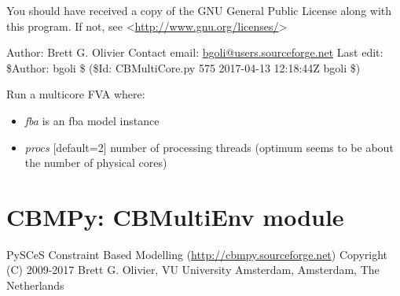 \documentclass[a4paper,11pt,english]{sphinxmanual}
\begin{document}
You should have received a copy of the GNU General Public License
along with this program.  If not, see \textless{}\url{http://www.gnu.org/licenses/}\textgreater{}

Author: Brett G. Olivier
Contact email: \href{mailto:bgoli@users.sourceforge.net}{bgoli@users.sourceforge.net}
Last edit: \$Author: bgoli \$ (\$Id: CBMultiCore.py 575 2017-04-13 12:18:44Z bgoli \$)

\begin{fulllineitems}
\label{modules_doc:cbmpy.CBMultiCore.grouper}
\end{fulllineitems}


\begin{fulllineitems}
\label{modules_doc:cbmpy.CBMultiCore.runMultiCoreFVA}
Run a multicore FVA where:
\begin{itemize}
\item {} 
\emph{fba} is an fba model instance

\item {} 
\emph{procs} {[}default=2{]} number of processing threads (optimum seems to be about the number of physical cores)

\end{itemize}

\end{fulllineitems}

\label{modules_doc:module-cbmpy.CBMultiEnv}

\section{CBMPy: CBMultiEnv module}
\label{modules_doc:cbmpy-cbmultienv-module}
PySCeS Constraint Based Modelling (\url{http://cbmpy.sourceforge.net})
Copyright (C) 2009-2017 Brett G. Olivier, VU University Amsterdam, Amsterdam, The Netherlands
\end{document}
